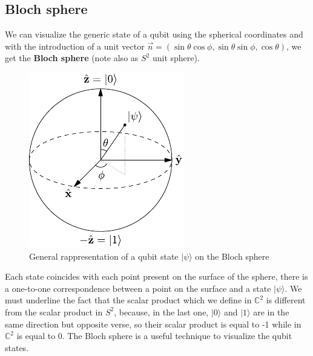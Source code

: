 \subsection{Bloch sphere}
We can visualize the generic state of a qubit using the spherical coordinates and with the introduction of a unit vector $\vec n = (\sin \theta \cos \phi, \sin \theta \sin \phi, \cos \theta)$, we get the \textbf{Bloch sphere} (note also as $S^2$ unit sphere).

\begin{figure}[!ht]
    \centering
    \includegraphics{images/chapter1/Bloch_Sphere.pdf}
    \caption{General rappresentation of a qubit state $|\psi\rangle$ on the Bloch sphere}
    \label{fig:BlochSphere}
\end{figure}

\noindent Each state coincides with each point present on the surface of the sphere, there is a one-to-one correspondence between a point on the surface and a state $|\psi\rangle$. We must underline the fact that the scalar product which we define in $\mathbb{C}^2$ is different from the scalar product in $S^2$, because, in the last one, $|0\rangle$ and $|1\rangle$ are in the same direction but opposite verse, so their scalar product is equal to -1 while in $\mathbb{C}^2$ is equal to 0. The Bloch sphere is a useful technique to visualize the qubit states.
\newpage


